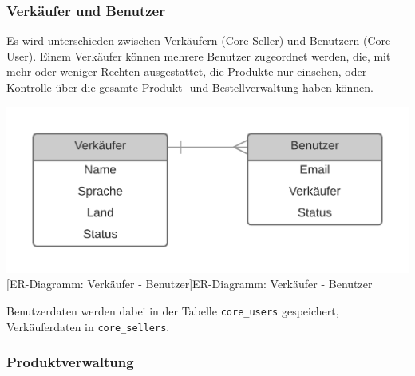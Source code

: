 	
	\subsubsection{Verkäufer und Benutzer}
	
	Es wird unterschieden zwischen Verkäufern (Core-Seller) und Benutzern (Core-User). Einem Verkäufer können mehrere Benutzer zugeordnet werden, die, mit mehr oder weniger Rechten ausgestattet, die Produkte nur einsehen, oder Kontrolle über die gesamte Produkt- und Bestellverwaltung haben können.\\
	\begin{minipage}{\linewidth}
		\vspace{1em}
		\centering
		\includegraphics[width=0.6\linewidth]{img/ERD_Seller_User_complete}
		[ER-Diagramm: Verkäufer - Benutzer]{ER-Diagramm: Verkäufer - Benutzer}
		\label{fig:header}
		\vspace{1em}
	\end{minipage}
	
	Benutzerdaten werden dabei in der Tabelle \texttt{core\_users} gespeichert, Verkäuferdaten in \texttt{core\_sellers}.

	 
	
	\subsubsection{Produktverwaltung}
	
